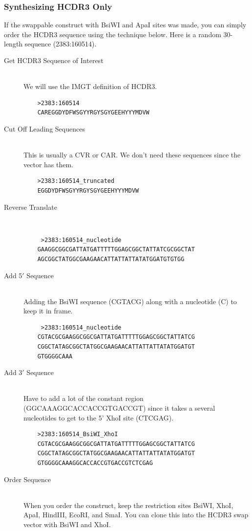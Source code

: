 \subsubsection{Synthesizing HCDR3 Only}
If the swappable construct with BsiWI and ApaI sites was made, you can simply order the HCDR3 sequence using the technique below. Here is a random 30-length sequence (2383:160514).
\begin{description}
  \item[Get HCDR3 Sequence of Interest] \hfill \\
  We will use the IMGT definition of HCDR3.
    \begin{verbatim}
    >2383:160514
    CAREGGDYDFWSGYYRGYSGYGEEHYYYMDVW
    \end{verbatim}
 \item[Cut Off Leading Sequences] \hfill \\
 This is usually a CVR or CAR. We don't need these sequences since the vector has them.
    \begin{verbatim}
    >2383:160514_truncated
    EGGDYDFWSGYYRGYSGYGEEHYYYMDVW
    \end{verbatim}
 \item[Reverse Translate] \hfill \\
    \begin{verbatim}
     >2383:160514_nucleotide
    GAAGGCGGCGATTATGATTTTTGGAGCGGCTATTATCGCGGCTAT
    AGCGGCTATGGCGAAGAACATTATTATTATATGGATGTGTGG
    \end{verbatim}
 \item[Add 5$'$ Sequence] \hfill \\
 Adding the BsiWI sequence (CGTACG) along with a nucleotide (C) to keep it in frame.
    \begin{verbatim}
     >2383:160514_nucleotide
    CGTACGCGAAGGCGGCGATTATGATTTTTGGAGCGGCTATTATCG
    CGGCTATAGCGGCTATGGCGAAGAACATTATTATTATATGGATGT
    GTGGGGCAAA
    \end{verbatim}
\item[Add 3$'$ Sequence] \hfill \\
Have to add a lot of the constant region (GGCAAAGGCACCACCGTGACCGT) since it takes a several nucleotides to get to the 5' XhoI site (CTCGAG).
    \begin{verbatim}
    >2383:160514_BsiWI_XhoI
    CGTACGCGAAGGCGGCGATTATGATTTTTGGAGCGGCTATTATCG
    CGGCTATAGCGGCTATGGCGAAGAACATTATTATTATATGGATGT
    GTGGGGCAAAGGCACCACCGTGACCGTCTCGAG
    \end{verbatim}
\item[Order Sequence] \hfill \\
 When you order the construct, keep the restriction sites BsiWI, XhoI, ApaI, HindIII, EcoRI, and SmaI. You can clone this into the HCDR3 swap vector with BsiWI and XhoI.
\end{description}

